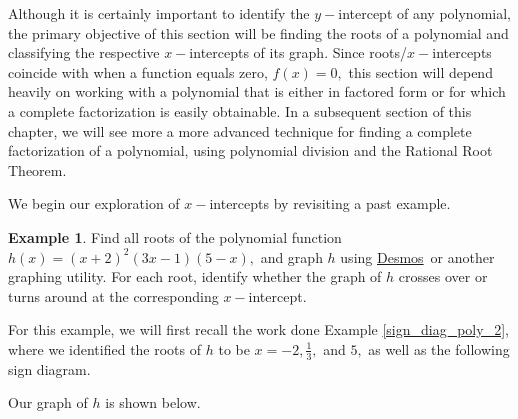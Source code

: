 \documentclass[12pt]{book}
\theoremstyle{definition}
\newtheorem{example}{Example}
\newcommand{\Desmos}{\href{https://www.desmos.com/}{Desmos}}
\begin{document}
Although it is certainly important to identify the $y-$intercept of any polynomial, the primary objective of this section will be finding the roots of a polynomial and classifying the respective $x-$intercepts of its graph.  Since roots/$x-$intercepts coincide with when a function equals zero, $f(x)=0,$ this section will depend heavily on working with a polynomial that is either in factored form or for which a complete factorization is easily obtainable.  In a subsequent section of this chapter, we will see more a more advanced technique for finding a complete factorization of a polynomial, using polynomial division and the Rational Root Theorem.
\par
We begin our exploration of $x-$intercepts by revisiting a past example.
\begin{example}
Find all roots of the polynomial function $h(x)=(x+2)^2(3x-1)(5-x),$ and graph $h$ using \Desmos \ or another graphing utility.  For each root, identify whether the graph of $h$ crosses over or turns around at the corresponding $x-$intercept.
\par
For this example, we will first recall the work done Example \ref{sign_diag_poly_2}, where we identified the roots of $h$ to be $x=-2,\frac{1}{3},$ and $5,$ as well as the following sign diagram.
\begin{center}
\end{center}

Our graph of $h$ is shown below.


\end{example}
\end{document}
